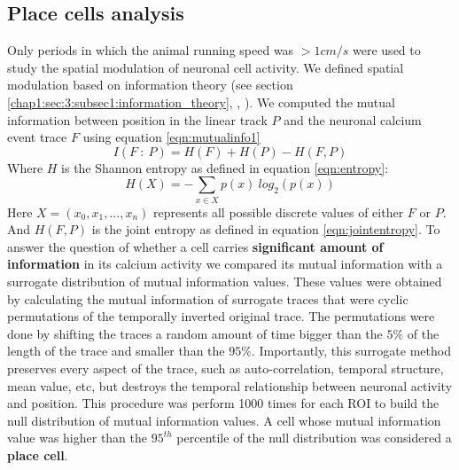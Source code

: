 \subsection{Place cells analysis}
Only periods in which the animal running speed was $> 1 cm/s$ were used to study the spatial modulation of neuronal cell activity. 
We defined spatial modulation based on information theory (see section \ref{chap1:sec:3:subsec1:information_theory}, \cite{shannon1948}, \cite{quirogapanzeri2013}). 
We computed the mutual information between position in the linear track $P$ and the neuronal calcium event trace $F$ using equation \ref{eqn:mutualinfo1}
\begin{equation}
\label{eqn:mutualinfoPF}
    I(F\ :\ P) = H(F)+H(P)-H(F , P)
\end{equation}
Where $H$ is the Shannon entropy as defined in equation \ref{eqn:entropy}:
\begin{equation}
    H(X)= -\sum_{x\in X}p(x)\ log_2(p(x))
\end{equation}
Here $X = (x_0, x_1, ... , x_n)$ represents all possible discrete values of either $F$ or $P$.
And $H(F,P)$ is the joint entropy as defined in equation \ref{eqn:jointentropy}.
To answer the question of whether a cell carries \textbf{significant amount of information} in its calcium activity we compared its mutual information with a surrogate distribution of mutual information values. 
These values were obtained by calculating the mutual information of surrogate traces that were cyclic permutations of the temporally inverted original trace.
The permutations were done by shifting the traces a random amount of time bigger than the $5\%$ of the length of the trace and smaller than the $95\%$.
Importantly, this surrogate method preserves every aspect of the trace, such as auto-correlation, temporal structure, mean value, etc, but destroys the temporal relationship between neuronal activity and position.  
This procedure was perform 1000 times for each ROI to build the null distribution of mutual information values.
A cell whose mutual information value was higher than the $95^{th}$ percentile of the null distribution was considered a \textbf{place cell}. 

